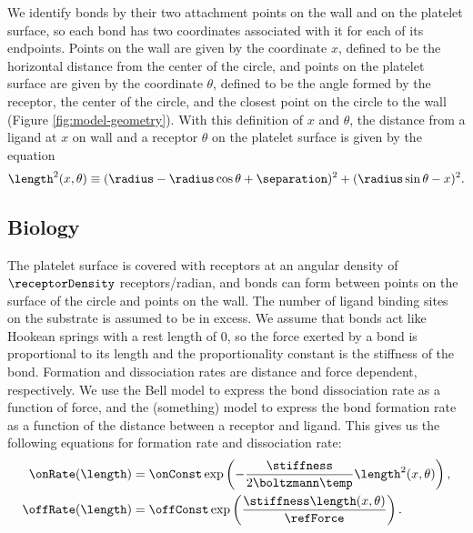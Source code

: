 We identify bonds by their two attachment points on the wall and on
the platelet surface, so each bond has two coordinates associated with
it for each of its endpoints. Points on the wall are given by the
coordinate $x$, defined to be the horizontal distance from the center
of the circle, and points on the platelet surface are given by the
coordinate $\theta$, defined to be the angle formed by the receptor,
the center of the circle, and the closest point on the circle to the
wall (Figure \ref{fig:model-geometry}). With this definition of $x$
and $\theta$, the distance from a ligand at $x$ on wall and a receptor
$\theta$ on the platelet surface is given by the equation
\begin{equation}
  \label{eq:dim-length}
  \length^2 (x, \theta) \equiv (\radius - \radius\cos\theta +
  \separation)^2 + (\radius\sin\theta - x)^2.
\end{equation}

\subsection{Biology}
\label{sec:biology}

The platelet surface is covered with receptors at an angular density
of $\receptorDensity$ receptors/radian, and bonds can form between
points on the surface of the circle and points on the wall. The number
of ligand binding sites on the substrate is assumed to be in
excess. We assume that bonds act like Hookean springs with a rest
length of 0, so the force exerted by a bond is proportional to its
length and the proportionality constant is the stiffness of the
bond. Formation and dissociation rates are distance and force
dependent, respectively. We use the Bell model \cite{Bell1978} to
express the bond dissociation rate as a function of force, and the
(something) model to express the bond formation rate as a function of
the distance between a receptor and ligand. This gives us the
following equations for formation rate and dissociation rate:
\begin{align}
  \label{eq:binding}
  \onRate(\length) &= \onConst \exp
                     \left(-\frac{\stiffness}{2\boltzmann\temp}
                     \length^2(x, \theta) \right), \\
  \label{eq:unbinding}
  \offRate(\length) &= \offConst \exp \left( \frac{\stiffness
                      \length(x, \theta)}{\refForce} \right).
\end{align}

